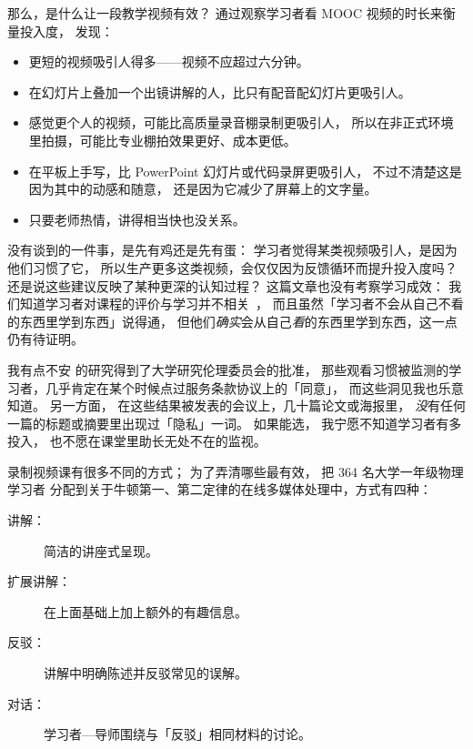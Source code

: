 那么，是什么让一段教学视频有效？
\cite{Guo2014}通过观察学习者看 MOOC 视频的时长来衡量投入度，
发现：

\begin{itemize}

\item
  更短的视频吸引人得多——视频不应超过六分钟。

\item
  在幻灯片上叠加一个出镜讲解的人，比只有配音配幻灯片更吸引人。

\item
  感觉更个人的视频，可能比高质量录音棚录制更吸引人，
  所以在非正式环境里拍摄，可能比专业棚拍效果更好、成本更低。

\item
  在平板上手写，比 PowerPoint 幻灯片或代码录屏更吸引人，
  不过不清楚这是因为其中的动感和随意，
  还是因为它减少了屏幕上的文字量。

\item
  只要老师热情，讲得相当快也没关系。

\end{itemize}

\cite{Guo2014}没有谈到的一件事，是先有鸡还是先有蛋：
学习者觉得某类视频吸引人，是因为他们习惯了它，
所以生产更多这类视频，会仅仅因为反馈循环而提升投入度吗？
还是说这些建议反映了某种更深的认知过程？
这篇文章也没有考察学习成效：
我们知道学习者对课程的评价与学习并不相关~\cite{Star2014,Uttl2017}，
而且虽然「学习者不会从自己不看的东西里学到东西」说得通，
但他们\emph{确实}会从自己\emph{看}的东西里学到东西，这一点仍有待证明。

\begin{aside}{我有点不安}
  \cite{Guo2014}的研究得到了大学研究伦理委员会的批准，
  那些观看习惯被监测的学习者，几乎肯定在某个时候点过服务条款协议上的「同意」，
  而这些洞见我也乐意知道。
  另一方面，
  在这些结果被发表的会议上，几十篇论文或海报里，
  \emph{没}有任何一篇的标题或摘要里出现过「隐私」一词。
  如果能选，
  我宁愿不知道学习者有多投入，
  也不愿在课堂里助长无处不在的监视。
\end{aside}

录制视频课有很多不同的方式；
为了弄清哪些最有效，
\cite{Mull2007a}把 364 名大学一年级物理学习者
分配到关于牛顿第一、第二定律的在线多媒体处理中，方式有四种：

\begin{description}

\item[讲解：]
  简洁的讲座式呈现。

\item[扩展讲解：]
  在上面基础上加上额外的有趣信息。

\item[反驳：]
  讲解中明确陈述并反驳常见的误解。

\item[对话：]
  学习者—导师围绕与「反驳」相同材料的讨论。

\end{description}

